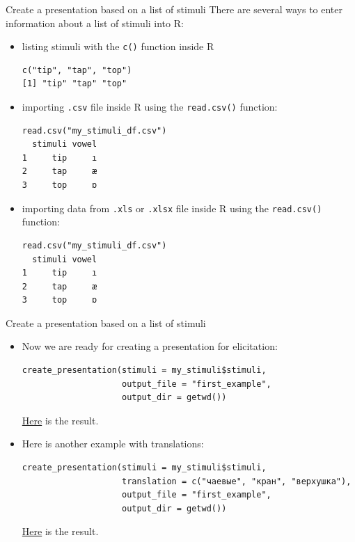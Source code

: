 \documentclass[13pt, t]{beamer}
\begin{document}
\begin{frame}[fragile]{Create a presentation based on a list of stimuli}
There are several ways to enter information about a list of stimuli into R:
\begin{itemize}
\item listing stimuli with the \texttt{c()}  function inside R
\begin{verbatim}
c("tip", "tap", "top")
[1] "tip" "tap" "top"
\end{verbatim}
\item importing \texttt{.csv} file inside R using the \texttt{read.csv()} function:
\begin{verbatim}
read.csv("my_stimuli_df.csv")
  stimuli vowel
1     tip     ı
2     tap     æ
3     top     ɒ
\end{verbatim}
\item importing data from \texttt{.xls} or \texttt{.xlsx} file inside R using the \texttt{read.csv()} function:
\begin{verbatim}
read.csv("my_stimuli_df.csv")
  stimuli vowel
1     tip     ı
2     tap     æ
3     top     ɒ
\end{verbatim}
\end{itemize}
\end{frame}

\begin{frame}[fragile]{Create a presentation based on a list of stimuli}
\begin{itemize}
\item Now we are ready for creating a presentation for elicitation:
\begin{verbatim}
create_presentation(stimuli = my_stimuli$stimuli,
                    output_file = "first_example",
                    output_dir = getwd()) 
\end{verbatim}
\href{https://agricolamz.github.io/phonfieldwork/first_example.html}{Here} is the result.
\item Here is another example with translations:
\begin{verbatim}
create_presentation(stimuli = my_stimuli$stimuli,
                    translation = c("чаевые", "кран", "верхушка"),
                    output_file = "first_example",
                    output_dir = getwd()) 
\end{verbatim}
\href{https://agricolamz.github.io/phonfieldwork/second_example.html}{Here} is the result.
\end{itemize}
\end{frame}
\end{document}
